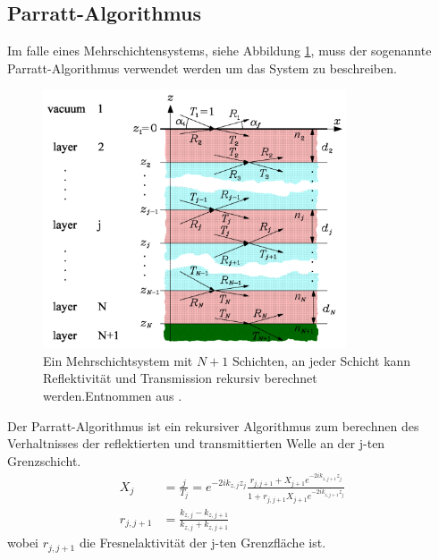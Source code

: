     \subsection{Parratt-Algorithmus}
        Im falle eines Mehrschichtensystems, siehe Abbildung \ref{fig:mehrschicht}, muss der sogenannte Parratt-Algorithmus verwendet werden um das System zu beschreiben.
        \begin{figure}[ht]
            \centering
            \includegraphics[width = 0.8\textwidth]{bilder/Mehrschichtsystem.png}
            \caption{Ein Mehrschichtsystem mit $N+1$ Schichten, an jeder Schicht kann Reflektivität und Transmission rekursiv berechnet werden.Entnommen aus \cite{tu_dortmund_versuchsanleitung_2021_e1}.}
            \label{fig:mehrschicht}
        \end{figure}
        Der Parratt-Algorithmus ist ein rekursiver Algorithmus zum berechnen des Verhaltnisses der reflektierten und transmittierten Welle an der j-ten Grenzschicht.
        \begin{align}
            \label{eqn:parratt}
            X_j &= \frac{j}{T_j} = e^{-2ik_{z,j}z_j} \frac{r_{j,j+1} + X_{j+1} e^{-2ik_{z,j+1}z_j}}{1 + r_{j,j+1}X_{j+1} e^{-2ik_{z,j+1}z_j}}\\
            r_{j,j+1} &= \frac{k_{z,j} - k_{z,j+1}}{k_{z,j} + k_{z,j+1}}
        \end{align}
        wobei $r_{j,j+1}$ die Fresnelaktivität der j-ten Grenzfläche ist.
